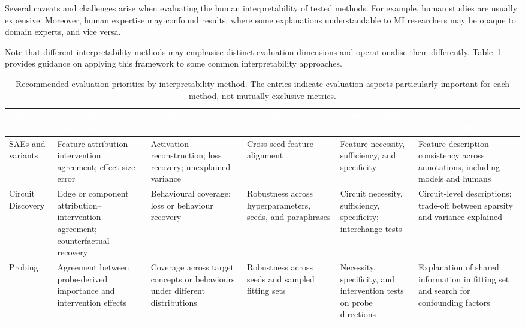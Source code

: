 Several caveats and challenges arise when evaluating the human interpretability of tested methods. For example, human studies are usually expensive. Moreover, human expertise may confound results, where some explanations understandable to MI researchers may be opaque to domain experts, and vice versa.

Note that different interpretability methods may emphasise distinct evaluation dimensions and operationalise them differently. Table~\ref{tab:method-evaluation} provides guidance on applying this framework to some common interpretability approaches.

\begin{table}[tb]
\centering
\caption{Recommended evaluation priorities by interpretability method. The entries indicate evaluation aspects particularly important for each method, not mutually exclusive metrics.}
\label{tab:method-evaluation}
\renewcommand{\arraystretch}{1.35}
\begin{tabular}{>{\raggedright\arraybackslash}p{2.7cm}
>{\raggedright\arraybackslash}p{2.25cm}
>{\raggedright\arraybackslash}p{2.25cm}
>{\raggedright\arraybackslash}p{2.25cm}
>{\raggedright\arraybackslash}p{2.25cm}
>{\raggedright\arraybackslash}p{2.25cm}}
\toprule
\rowcolor{tableheader!80}
\textcolor{white}{\textbf{Method}} &
\textcolor{white}{\textbf{Attribution Faithfulness}} &
\textcolor{white}{\textbf{Completeness}} &
\textcolor{white}{\textbf{Stability}} &
\textcolor{white}{\textbf{Causal Validity}} &
\textcolor{white}{\textbf{Human Interpretability}} \\
\midrule

\rowcolor{tablerow1}
SAEs and variants &
Feature attribution--intervention agreement; effect-size error &
Activation reconstruction; loss recovery; unexplained variance &
Cross-seed feature alignment &
Feature necessity, sufficiency, and specificity &
Feature description consistency across annotations, including models and humans \\

\rowcolor{tablerow2}
Circuit Discovery &
Edge or component attribution--intervention agreement; counterfactual recovery &
Behavioural coverage; loss or behaviour recovery &
Robustness across hyperparameters, seeds, and paraphrases &
Circuit necessity, sufficiency, specificity; interchange tests &
Circuit-level descriptions; trade-off between sparsity and variance explained \\

\rowcolor{tablerow1}
Probing &
Agreement between probe-derived importance and intervention effects &
Coverage across target concepts or behaviours under different distributions &
Robustness across seeds and sampled fitting sets &
Necessity, specificity, and intervention tests on probe directions &
Explanation of shared information in fitting set and search for confounding factors \\


\end{tabular}
\end{table}
